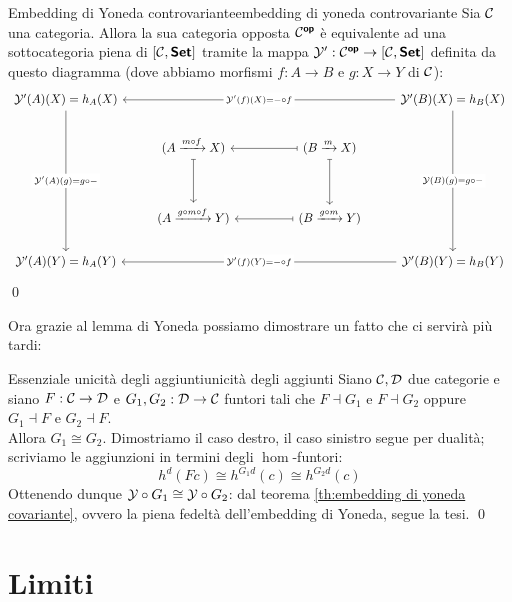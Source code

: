 \documentclass{article}
\renewcommand\C{\mc{C}}
\newcommand\D{\mc{D}}
\begin{document}
\begin{corollary}{Embedding di Yoneda controvariante}{embedding di yoneda controvariante}
    Sia $\C$ una categoria. Allora la sua categoria opposta $\C^\op$ è equivalente ad una sottocategoria piena di $[\C, \setcat]$ tramite la mappa $\mc{Y}' : \C^\op \to [\C, \setcat]$ definita da questo diagramma (dove abbiamo morfismi $f:A\to B$ e $g:X\to Y$ di $\C$):
    \[\begin{tikzcd}
    	{\mc{Y}'(A)(X) = h_A(X)} &&&& {\mc{Y}'(B)(X) = h_B(X)} \\
    	& {(A \xrightarrow{m\circ f} X)} && {(B \xrightarrow{m} X)} \\
    	\\
    	& {(A \xrightarrow{g\circ m\circ f} Y)} && {(B \xrightarrow{g\circ m} Y)} \\
    	{\mc{Y}'(A)(Y) = h_A(Y)} &&&& {\mc{Y}'(B)(Y) = h_B(Y)}
    	\arrow["{\mc{Y}'(A)(g) = g\circ -}"{description}, from=1-1, to=5-1]
    	\arrow["{\mc{Y}'(f)(X) = -\circ f}"{description}, from=1-5, to=1-1]
    	\arrow["{\mc{Y}(B)(g) = g\circ -}"{description}, from=1-5, to=5-5]
    	\arrow[maps to, from=2-2, to=4-2]
    	\arrow[maps to, from=2-4, to=2-2]
    	\arrow[maps to, from=2-4, to=4-4]
	    \arrow[maps to, from=4-4, to=4-2]
	    \arrow["{\mc{Y}'(f)(Y) = -\circ f}"{description}, from=5-5, to=5-1]
    \end{tikzcd}\]
    \qed
\end{corollary}

Ora grazie al lemma di Yoneda possiamo dimostrare un fatto che ci servirà più tardi:

\begin{lemma}{Essenziale unicità degli aggiunti}{unicità degli aggiunti}
    Siano $\C,\D$ due categorie e siano $F:\C\to\D$ e $G_1,G_2: \D\to\C$ funtori tali che $F\dashv G_1$ e $F\dashv G_2$ oppure $G_1\dashv F$ e $G_2\dashv F$.\\
    Allora $G_1\cong G_2$.
    \proof 
    Dimostriamo il caso destro, il caso sinistro segue per dualità; scriviamo le aggiunzioni in termini degli $\hom$-funtori:
    \[ h^d(Fc) \cong h^{G_1 d}(c) \cong h^{G_2 d}(c) \]
    Ottenendo dunque $\mathcal{Y}\circ G_1 \cong \mathcal{Y}\circ G_2$: dal teorema \ref{th:embedding di yoneda covariante}, ovvero la piena fedeltà dell'embedding di Yoneda, segue la tesi.
    \qed
\end{lemma}

\section{Limiti}
\end{document}

